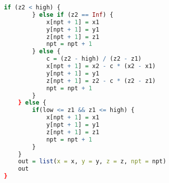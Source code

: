 \documentclass{report}
\begin{document}
\begin{lstlisting}[language = R]
        if (z2 < high) {
        } else if (z2 == Inf) {
            x[npt + 1] = x1
            y[npt + 1] = y1
            z[npt + 1] = z1
            npt = npt + 1
        } else {
            c = (z2 - high) / (z2 - z1)
            x[npt + 1] = x2 - c * (x2 - x1)
            y[npt + 1] = y1
            z[npt + 1] = z2 - c * (z2 - z1)
            npt = npt + 1
        }
    } else {
        if(low <= z1 && z1 <= high) {
            x[npt + 1] = x1
            y[npt + 1] = y1
            z[npt + 1] = z1
            npt = npt + 1
        }
    }
    out = list(x = x, y = y, z = z, npt = npt)
    out
}
\end{lstlisting}
\end{document}
